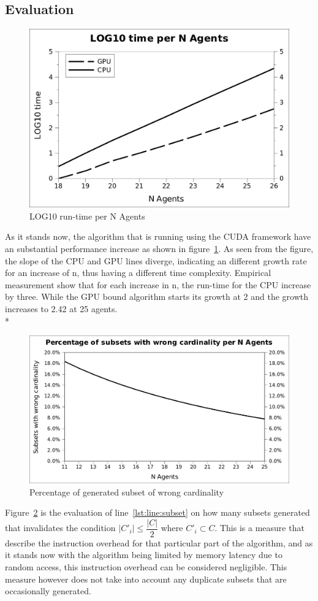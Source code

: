 \documentclass[a4paper, 12pt]{report}
\begin{document}
\subsection{Evaluation}

\begin{figure}[htb]
\centering
\includegraphics[width=0.7\linewidth]{loggraph.jpg}
\caption{LOG10 run-time per N Agents\label{log}}
\end{figure}


As it stands now, the algorithm that is running using the CUDA framework have an substantial performance increase as shown in figure~\ref{log}. As seen from the figure, the slope of the CPU and GPU lines diverge, indicating an different growth rate for an increase of n, thus having a different time complexity. Empirical measurement show that for each increase in n, the run-time for the CPU increase by three. While the GPU bound algorithm starts its growth at 2 and the growth increases to 2.42 at 25 agents. \\*
\begin{figure}[htp]
\centering
\includegraphics[width=0.7\linewidth]{subset.jpg}
\caption{Percentage of generated subset of wrong cardinality\label{overhead}}
\end{figure}
\linebreak
Figure~\ref{overhead} is the evaluation of line~\ref{lst:line:subset} on how many subsets generated that invalidates the condition $\vert C'_{i} \vert \leq \dfrac{\vert C\vert }{2}$ where $C'_i \subset C$. This is a measure that describe the instruction overhead for that particular part of the algorithm, and as it stands now with the algorithm being limited by memory latency due to random access, this instruction overhead can be considered negligible. This measure however does not take into account any duplicate subsets that are occasionally generated.
\end{document}
